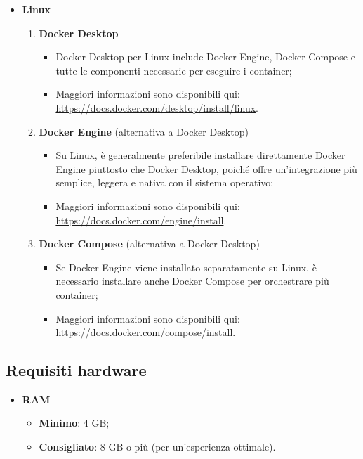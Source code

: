 \begin{itemize}
\begin{enumerate}
\begin{itemize}
    \end{itemize}
  \end{enumerate}
  \item \textbf{Linux}
  \begin{enumerate}
    \item \textbf{Docker Desktop}
    \begin{itemize}
      \item Docker Desktop per Linux include Docker Engine, Docker Compose e tutte le componenti necessarie per eseguire i container;
      \item Maggiori informazioni sono disponibili qui: \href{https://docs.docker.com/desktop/install/linux}{https://docs.docker.com/desktop/install/linux}.
    \end{itemize}
    \item \textbf{Docker Engine} (alternativa a Docker Desktop)
    \begin{itemize}
      \item Su Linux, è generalmente preferibile installare direttamente Docker Engine piuttosto che Docker Desktop, poiché offre un'integrazione più semplice, leggera e nativa con il sistema operativo;
      \item Maggiori informazioni sono disponibili qui: \href{https://docs.docker.com/engine/install}{https://docs.docker.com/engine/install}.
    \end{itemize}
    \item \textbf{Docker Compose} (alternativa a Docker Desktop)
    \begin{itemize}
      \item Se Docker Engine viene installato separatamente su Linux, è necessario installare anche Docker Compose per orchestrare più container;
      \item Maggiori informazioni sono disponibili qui: \href{https://docs.docker.com/compose/install}{https://docs.docker.com/compose/install}.
    \end{itemize}
  \end{enumerate}
\end{itemize}

\subsection{Requisiti hardware}
\begin{itemize}
  \item \textbf{RAM}
  \begin{itemize}
    \item \textbf{Minimo}: 4 GB;
    \item \textbf{Consigliato}: 8 GB o più (per un'esperienza ottimale).
  \end{itemize}
\end{itemize}

